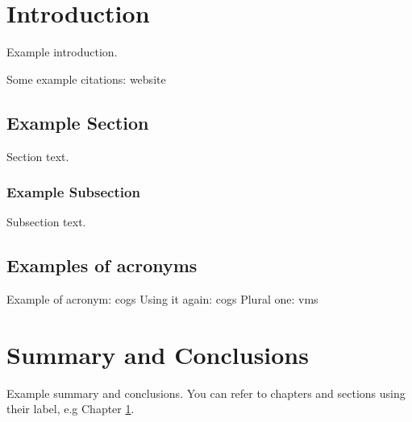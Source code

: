 \documentclass{UIdahoMastersThesis}
\begin{document}
	
	
	\mainmatter  %
	\setcounter{secnumdepth}{3}  %
	
	
	
	
	\clearpage
	\chapter{Introduction}
	\label{Chapter:Introduction}
	
	Example introduction. 
	
	Some example citations: website\cite{lambert2015}
	
	\section{Example Section}
	Section text.
	\subsection{Example Subsection}
	Subsection text. 
	
	
	\section{Examples of acronyms}
	Example of acronym: \ac{cogs}
	Using it again: \ac{cogs}
	Plural one: \acp{vm}
	
	
	
	
	\chapter{Summary and Conclusions}
	\label{Chapter:SummaryAndConclusions}
	
	Example summary and conclusions. You can refer to chapters and sections using their label, e.g Chapter \ref{Chapter:Introduction}.
	
\end{document}
